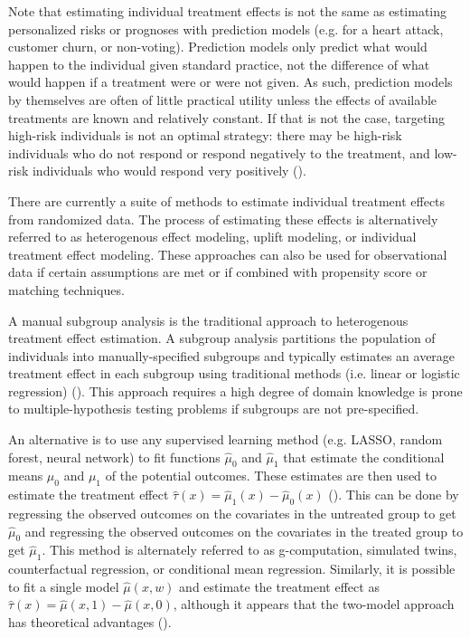 Note that estimating individual treatment effects is not the same as estimating personalized risks or prognoses with prediction models (e.g. for a heart attack, customer churn, or non-voting). Prediction models only predict what would happen to the individual given standard practice, not the difference of what would happen if a treatment were or were not given. As such, prediction models by themselves are often of little practical utility unless the effects of available treatments are known and relatively constant. If that is not the case, targeting high-risk individuals is not an optimal strategy: there may be high-risk individuals who do not respond or respond negatively to the treatment, and low-risk individuals who would respond very positively (\citealp{Ascarza:2018ie}).

There are currently a suite of methods to estimate individual treatment effects from randomized data. The process of estimating these effects is alternatively referred to as heterogenous effect modeling, uplift modeling, or individual treatment effect modeling. These approaches can also be used for observational data if certain assumptions are met or if combined with propensity score or matching techniques.

A manual subgroup analysis is the traditional approach to heterogenous treatment effect estimation. A subgroup analysis partitions the population of individuals into manually-specified subgroups and typically estimates an average treatment effect in each subgroup using traditional methods (i.e. linear or logistic regression) (\citealp{Gail:1985ft}). This approach requires a high degree of domain knowledge is prone to multiple-hypothesis testing problems if subgroups are not pre-specified. 

An alternative is to use any supervised learning method (e.g. LASSO, random forest, neural network) to fit functions $\hat\mu_0$ and $\hat\mu_1$ that estimate the conditional means $\mu_0$ and $\mu_1$ of the potential outcomes. These estimates are then used to estimate the treatment effect $\hat\tau(x) = \hat\mu_1(x) - \hat\mu_0(x)$ (\citealp{Gutierrez:2016tq, Austin:2012cy, Snowdn:2011ef}). This can be done by regressing the observed outcomes on the covariates in the untreated group to get $\hat\mu_0$ and regressing the observed outcomes on the covariates in the treated group to get $\hat\mu_1$. This method is alternately referred to as g-computation, simulated twins, counterfactual regression, or conditional mean regression. Similarly, it is possible to fit a single model $\hat\mu(x,w)$ and estimate the treatment effect as $\hat\tau(x) = \hat\mu(x,1) - \hat\mu(x,0)$, although it appears that the two-model approach has theoretical advantages (\citealp{Alaa:tj}).


